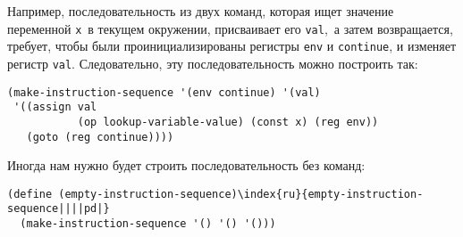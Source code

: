 Например, последовательность из двух команд, которая ищет
значение переменной {\tt x}~в текущем окружении, присваивает
его {\tt val},~а затем возвращается, требует, чтобы были
проинициализированы регистры {\tt env} и {\tt continue},
и изменяет регистр {\tt val}.  Следовательно, эту
последовательность можно построить так:

\begin{Verbatim}[fontsize=\small]
(make-instruction-sequence '(env continue) '(val)
 '((assign val
           (op lookup-variable-value) (const x) (reg env))
   (goto (reg continue))))
\end{Verbatim}

Иногда нам нужно будет строить последовательность без
команд:

\begin{Verbatim}[fontsize=\small]
(define (empty-instruction-sequence)\index{ru}{empty-instruction-sequence||||pd|}
  (make-instruction-sequence '() '() '()))
\end{Verbatim}

